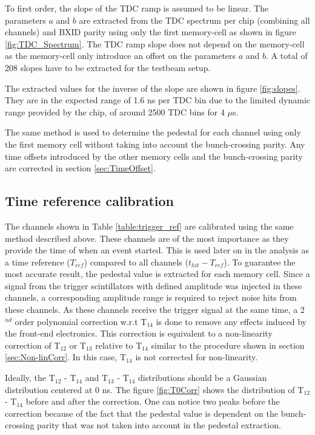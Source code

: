 \documentclass{JINST}
\begin{document}
To first order, the slope of the TDC ramp is assumed to be linear. The parameters $a$ and $b$ are extracted from the TDC spectrum per chip (combining all channels) and BXID parity using only the first memory-cell as shown in figure \ref{fig:TDC_Spectrum}. The TDC ramp slope does not depend on the memory-cell as the memory-cell only introduce an offset on the parameters $a$ and $b$. A total of 208 slopes have to be extracted for the testbeam setup.

The extracted values for the inverse of the slope are shown in figure \ref{fig:slopes}. They are in the expected range of 1.6 ns per TDC bin due to the limited dynamic range provided by the chip, of around 2500 TDC bins for 4 $\mu$s.

The same method is used to determine the pedestal for each channel using only the first memory cell without taking into account the bunch-crossing parity. Any time offsets introduced by the other memory cells and the bunch-crossing parity are corrected in section \ref{sec:TimeOffset}.

\subsection{Time reference calibration}

The channels shown in Table \ref{table:trigger_ref} are calibrated using the same method described above. These channels are of the most importance as they provide the time of when an event started. This is used later on in the analysis as a time reference ($T_{ref}$) compared to all channels ($t_{hit} - T_{ref}$). To guarantee the most accurate result, the pedestal value is extracted for each memory cell. Since a signal from the trigger scintillators with defined amplitude was injected in these channels, a corresponding amplitude range is required to reject noise hits from these channels. As these channels receive the trigger signal at the same time, a 2$^{nd}$ order polynomial correction w.r.t T$_{14}$ is done to remove any effects induced by the front-end electronics. This correction is equivalent to a non-linearity correction of T$_{12}$ or T$_{13}$ relative to T$_{14}$ similar to the procedure shown in section \ref{sec:Non-linCorr}. In this case, T$_{14}$ is not corrected for non-linearity.

Ideally, the T$_{12}$ - T$_{14}$ and T$_{13}$ - T$_{14}$ distributions should be a Gaussian distribution centered at 0 ns. The figure \ref{fig:T0Corr} shows the distribution of T$_{12}$ - T$_{14}$ before and after the correction. One can notice two peaks before the correction because of the fact that the pedestal value is dependent on the bunch-crossing parity that was not taken into account in the pedestal extraction.
\end{document}
